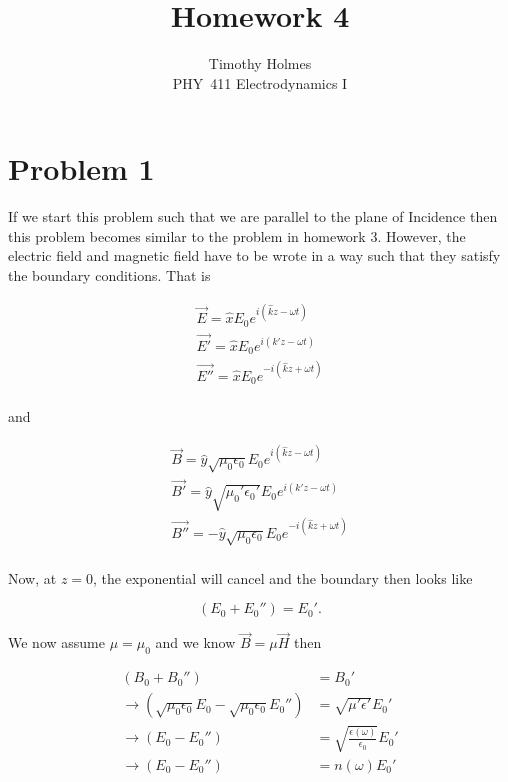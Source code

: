 \documentclass[11pt]{article}
\newcommand{\HWnum}{4}
\newcommand{\Subject}{PHY}
\begin{document}

\title{Homework {\HWnum}}
\author{Timothy Holmes \\ \Subject~411 Electrodynamics I}

\maketitle

\section*{Problem 1}



If we start this problem such that we are parallel to the plane of Incidence then this problem becomes similar to the problem in homework 3. However, the electric field and magnetic field have to be wrote in a way such that they satisfy the boundary conditions. That is


\begin{align*}
\vec{E} = \hat{x}E_{0}e^{i(\hat{k}z - \omega t)} \\
\vec{E'} = \hat{x}E_{0}e^{i(k'z - \omega t)}\\
\vec{E''} = \hat{x}E_{0}e^{-i(\hat{k}z + \omega t)} \\
\end{align*}


and

\begin{align*}
\vec{B} = \hat{y}\sqrt{\mu_{0} \epsilon_{0}}E_{0}e^{i(\hat{k}z - \omega t)} \\
\vec{B'} = \hat{y}\sqrt{\mu_{0}' \epsilon_{0}'}E_{0}e^{i(k'z - \omega t)}\\
\vec{B''} = -\hat{y}\sqrt{\mu_{0} \epsilon_{0}}E_{0}e^{-i(\hat{k}z + \omega t)} \\
\end{align*}

Now, at $z = 0$, the exponential will cancel and the boundary then looks like

$$
(E_{0} + E_{0}'') = E_{0}'.
$$

We now assume $\mu = \mu_{0}$ and we know $\vec{B} = \mu\vec{H}$ then 

\begin{align*}
(B_{0} + B_{0}'') &= B_{0}' \\
\rightarrow (\sqrt{\mu_{0} \epsilon_{0}} E_{0} - \sqrt{\mu_{0} \epsilon_{0}} E_{0}'') &= \sqrt{\mu' \epsilon'} E_{0}' \\
\rightarrow (E_{0} - E_{0}'') &= \sqrt{\frac{\epsilon(\omega)}{\epsilon_{0}}} E_{0}' \\
\rightarrow  (E_{0} - E_{0}'') &= n(\omega) E_{0}'
\end{align*}
\end{document}
